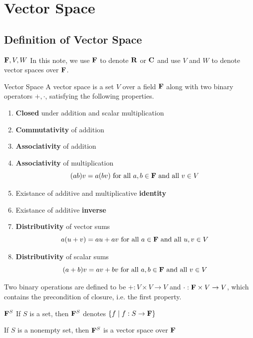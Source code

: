 \documentclass[12pt,a4paper]{article}
\begin{document}
    \maketitle
    \newpage
    \tableofcontents    
    \newpage
    \section{Vector Space}
    \subsection{Definition of Vector Space}
    \begin{notation}{$\mathbf{F},V,W$}
        In this note, we use $\mathbf{F}$ to denote $\mathbf{R}$ or $\mathbf{C}$ and use $V$ and $W$ to denote vector spaces over $\mathbf{F}$.
    \end{notation}
    \hfill
    \begin{defi}{Vector Space}
        A vector space is a set $V$ over a field $\mathbf{F}$ along with two binary operators $+,\cdot$, satisfying the following properties.
        \begin{enumerate}
            \item \textbf{Closed} under addition and scalar multiplication
            \item \textbf{Commutativity} of addition
            \item \textbf{Associativity} of addition
            \item \textbf{Associativity} of multiplication
            $$(ab)v=a(bv)
            \text{ for all }a,b\in\mathbf{F}\text{ and all }v\in V$$
            \item Existance of additive and multiplicative \textbf{identity}
            \item Existance of additive \textbf{inverse}
            \item \textbf{Distributivity} of vector sums
            $$a(u+v)=au+av\text{ for all }a\in\mathbf{F} \text{ and all }u,v\in V$$
            \item \textbf{Distributivity} of scalar sums
            $$(a+b)v=av+bv\text{ for all }a,b\in\mathbf{F} \text{ and all }v\in V$$
        \end{enumerate}
    \end{defi}
    \begin{remark}
        Two binary operations are defined to be $+:V\times V\to V$ and $\cdot:\mathbf{F}\times V\to V$, which contains the precondition of closure, i.e. the first property.
    \end{remark}
    \hfill
    \begin{notation}{$\mathbf{F}^S$}\label{1.3}
        If $S$ is a set, then $\mathbf{F}^S$ denotes $\left\{f\mid f:S\to \mathbf{F}\right\}$
    \end{notation}
    \begin{remark}
        If $S$ is a nonempty set, then $\mathbf{F}^S$ is a vector space over $\mathbf{F}$
    \end{remark}
    \hfill
    
\end{document}
